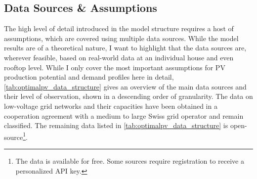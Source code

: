 \documentclass[12PT, ]{article}
\begin{document}
\subsection{Data Sources \& Assumptions} \label{subsec:}%
The high level of detail introduced in the model structure requires a host of assumptions, which are covered using multiple data sources. While the model results are of a theoretical nature, I want to highlight that the data sources are, wherever feasible, based on real-world data at an individual house and even rooftop level. 
%
While I only cover the most important assumptions for PV production potential and demand profiles here in detail, \ref{tab:optimalpv_data_structure} gives an overview of the main data sources and their level of observation, shown in a descending order of granularity. 
The data on low-voltage grid networks and their capacities have been obtained in a cooperation agreement with a medium to large Swiss grid operator and remain classified.
The remaining data listed in \ref{tab:optimalpv_data_structure} is open-source\footnote{The data is available for free. Some sources require registration to receive a personalized API key. }. 
%
\end{document}
